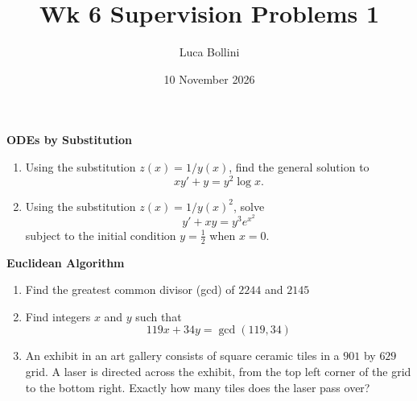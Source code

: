 \documentclass{article}
\title{Wk 6 Supervision Problems 1}
\author{Luca Bollini}
\date{10 November 2026}
\begin{document}
\maketitle

\begin{center}
\huge{\textbf{ODEs by Substitution}}
\end{center}

\begin{enumerate}
    \item Using the substitution $z(x) = 1/y(x)$, find the general solution to
    \[
    xy' + y = y^2\log x.
    \]
    \item Using the substitution $z(x) = 1/y(x)^2$, solve
    \[
    y' + xy = y^3e^{x^2}
    \]
    subject to the initial condition $y=\frac{1}{2}$ when $x=0$.
\end{enumerate}

\begin{center}
\huge{\textbf{Euclidean Algorithm}}
\end{center}

\begin{enumerate}
    \item Find the greatest common divisor (gcd) of $2244$ and $2145$
    \item Find integers $x$ and $y$ such that
    \[
    119x + 34y = \gcd(119,34)
    \]
    \item An exhibit in an art gallery consists of square ceramic tiles in a $901$ by $629$ grid. A laser is directed across the exhibit, from the top left corner of the grid to the bottom right. Exactly how many tiles does the laser pass over?
\end{enumerate}
\end{document}
